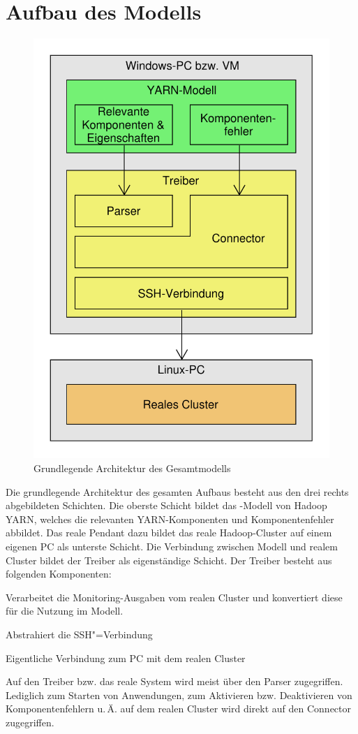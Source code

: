 \chapter{Aufbau des Modells}\label{chap:modell}

\begin{figure}
    \centering
    \includegraphics[width=0.5\columnwidth]{./images/modelArchitecture.pdf}
    \caption{Grundlegende Architektur des Gesamtmodells}
    \label{fig:modelArchitecture}
\end{figure}

Die grundlegende Architektur des gesamten Aufbaus besteht aus den drei rechts abgebildeten Schichten. Die oberste Schicht bildet das \sS-Modell von Hadoop YARN, welches die relevanten YARN-Komponenten und Komponentenfehler abbildet. Das reale Pendant dazu bildet das reale Hadoop-Cluster auf einem eigenen PC als unterste Schicht. Die Verbindung zwischen Modell und realem Cluster bildet der Treiber als eigenständige Schicht. Der Treiber besteht aus folgenden Komponenten:

\begin{description}[noitemsep]
    \item [Parser] Verarbeitet die Monitoring-Ausgaben vom realen Cluster und konvertiert diese für die Nutzung im Modell.
    \item [Connector] Abstrahiert die SSH"=Verbindung
    \item [SSH-Verbindung] Eigentliche Verbindung zum PC mit dem realen Cluster
\end{description}

Auf den Treiber bzw. das reale System wird meist über den Parser zugegriffen. Lediglich zum Starten von Anwendungen, zum Aktivieren bzw. Deaktivieren von Komponentenfehlern u.\,Ä. auf dem realen Cluster wird direkt auf den Connector zugegriffen.

%



